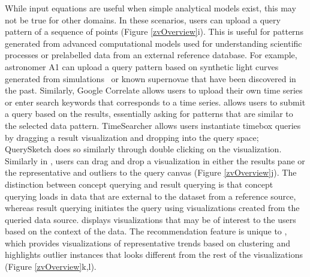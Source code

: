While input equations are useful when simple analytical models exist, this may not be true for other domains. In these scenarios, users can upload a query pattern of a sequence of points (Figure \ref{zvOverview}i). This is useful for patterns generated from advanced computational models used for understanding scientific processes or prelabelled data from an external reference database. For example, astronomer A1 can upload a query pattern based on synthetic light curves generated from simulations~\cite{Nugent1997} or known supernovae that have been discovered in the past. Similarly, Google Correlate allows users to upload their own time series or enter search keywords that corresponds to a time series.
 allows users to submit a query based on the results, essentially asking for patterns that are similar to the selected data pattern. TimeSearcher allows users instantiate timebox queries by dragging a result visualization and dropping into the query space; QuerySketch does so similarly through double clicking on the visualization. Similarly in \zv, users can drag and drop a visualization in either the results pane or the representative and outliers to the query canvas (Figure \ref{zvOverview}j). The distinction between concept querying and result querying is that concept querying loads in data that are external to the dataset from a reference source, whereas result querying initiates the query using visualizations created from the queried data source.
 displays visualizations that may be of interest to the users based on the context of the data. The recommendation feature is unique to \zv, which provides visualizations of representative trends based on clustering and highlights outlier instances that looks different from the rest of the visualizations (Figure \ref{zvOverview}k,l).
